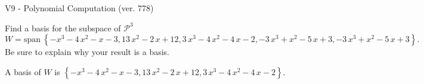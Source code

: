 \begin{exercise}
  \begin{exerciseTitle}V9 - Polynomial Computation (ver. 778)\end{exerciseTitle}
  \begin{exerciseStatement}
    Find a basis for the subspace of \(\mathcal{P}^3\) 
\[W=\mathrm{span}\ \left\{-x^{3} - 4 \, x^{2} - x - 3 , 13 \, x^{2} - 2 \, x + 12 , 3 \, x^{3} - 4 \, x^{2} - 4 \, x - 2 , -3 \, x^{3} + x^{2} - 5 \, x + 3 , -3 \, x^{3} + x^{2} - 5 \, x + 3\right\}.\]
 Be sure to explain why your result is a basis.


  \end{exerciseStatement}
  \begin{exerciseAnswer}
   A basis of \(W\) is  \(\left\{-x^{3} - 4 \, x^{2} - x - 3 , 13 \, x^{2} - 2 \, x + 12 , 3 \, x^{3} - 4 \, x^{2} - 4 \, x - 2\right\}\).
  


  \end{exerciseAnswer}
\end{exercise}